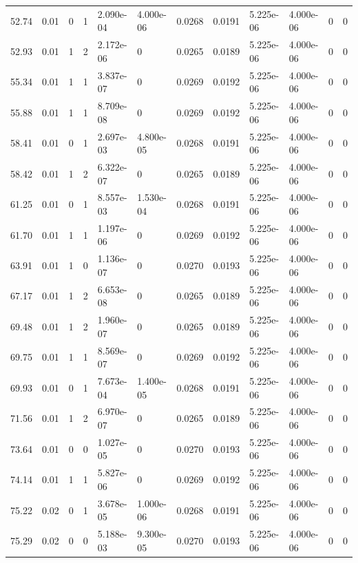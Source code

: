 \documentclass[preview]{standalone}
\begin{document}
{{{\begin{tabular}{L{1.2cm}C{1.2cm} C{0.3cm}C{0.5cm} C{1.4cm}C{1.4cm} C{1.4cm}C{1.4cm} C{1.6cm}C{1.6cm} C{1.6cm}C{1.6cm}}
  52.74  &  0.01  & 0     &  1 &  2.090e-04  & 4.000e-06  &  0.0268&   0.0191& 5.225e-06 & 4.000e-06   &  0 & 0  \\ 
  52.93  &  0.01  & 1     &  2 &  2.172e-06  & 0  &  0.0265&   0.0189& 5.225e-06 & 4.000e-06   &  0 & 0  \\ 
  55.34  &  0.01  & 1     &  1 &  3.837e-07  & 0  &  0.0269&   0.0192& 5.225e-06 & 4.000e-06   &  0 & 0  \\ 
  55.88  &  0.01  & 1     &  1 &  8.709e-08  & 0  &  0.0269&   0.0192& 5.225e-06 & 4.000e-06   &  0 & 0  \\ 
  58.41  &  0.01  & 0     &  1 &  2.697e-03  & 4.800e-05  &  0.0268&   0.0191& 5.225e-06 & 4.000e-06   &  0 & 0  \\ 
  58.42  &  0.01  & 1     &  2 &  6.322e-07  & 0  &  0.0265&   0.0189& 5.225e-06 & 4.000e-06   &  0 & 0  \\ 
  61.25  &  0.01  & 0     &  1 &  8.557e-03  & 1.530e-04  &  0.0268&   0.0191& 5.225e-06 & 4.000e-06   &  0 & 0  \\ 
  61.70  &  0.01  & 1     &  1 &  1.197e-06  & 0  &  0.0269&   0.0192& 5.225e-06 & 4.000e-06   &  0 & 0  \\ 
  63.91  &  0.01  & 1     &  0 &  1.136e-07  & 0  &  0.0270&   0.0193& 5.225e-06 & 4.000e-06   &  0 & 0  \\ 
  67.17  &  0.01  & 1     &  2 &  6.653e-08  & 0  &  0.0265&   0.0189& 5.225e-06 & 4.000e-06   &  0 & 0  \\ 
  69.48  &  0.01  & 1     &  2 &  1.960e-07  & 0  &  0.0265&   0.0189& 5.225e-06 & 4.000e-06   &  0 & 0  \\ 
  69.75  &  0.01  & 1     &  1 &  8.569e-07  & 0  &  0.0269&   0.0192& 5.225e-06 & 4.000e-06   &  0 & 0  \\ 
  69.93  &  0.01  & 0     &  1 &  7.673e-04  & 1.400e-05  &  0.0268&   0.0191& 5.225e-06 & 4.000e-06   &  0 & 0  \\ 
  71.56  &  0.01  & 1     &  2 &  6.970e-07  & 0  &  0.0265&   0.0189& 5.225e-06 & 4.000e-06   &  0 & 0  \\ 
  73.64  &  0.01  & 0     &  0 &  1.027e-05  & 0  &  0.0270&   0.0193& 5.225e-06 & 4.000e-06   &  0 & 0  \\ 
  74.14  &  0.01  & 1     &  1 &  5.827e-06  & 0  &  0.0269&   0.0192& 5.225e-06 & 4.000e-06   &  0 & 0  \\ 
  75.22  &  0.02  & 0     &  1 &  3.678e-05  & 1.000e-06  &  0.0268&   0.0191& 5.225e-06 & 4.000e-06   &  0 & 0  \\ 
  75.29  &  0.02  & 0     &  0 &  5.188e-03  & 9.300e-05  &  0.0270&   0.0193& 5.225e-06 & 4.000e-06   &  0 & 0  \\ 

\end{tabular}}}}
\end{document}
